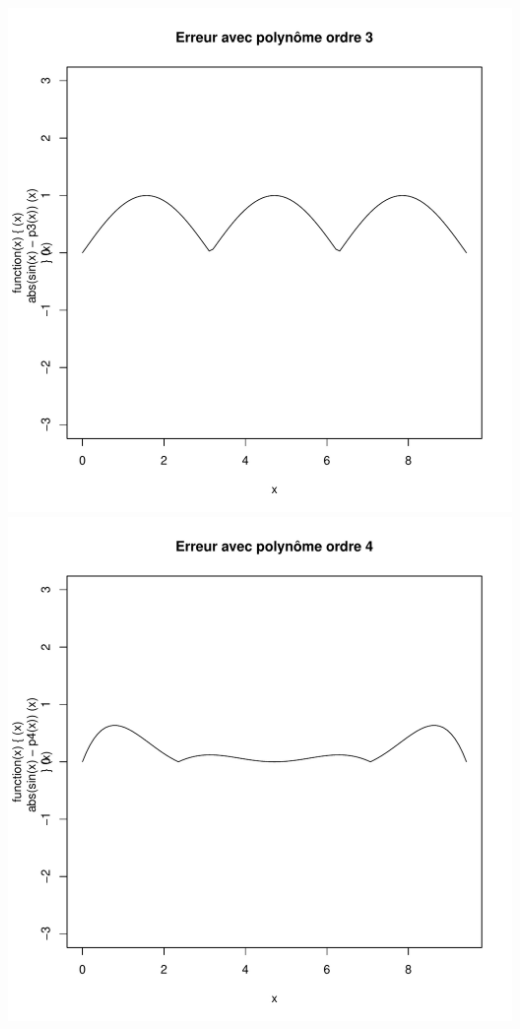 \documentclass[10pt]{article}
\begin{document}
\includegraphics[scale=0.4]{data/p3}
\includegraphics[scale=0.4]{data/p4}
\end{document}
